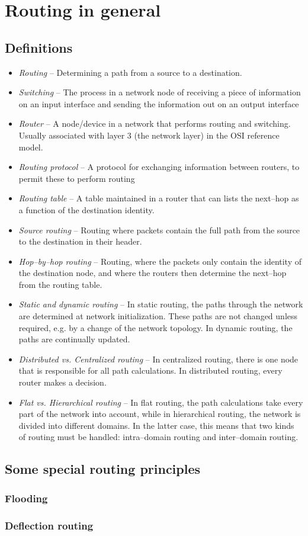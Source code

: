 \section{Routing in general}

\subsection{Definitions}
\begin{itemize}
%
\item\emph{Routing} -- Determining a path from a source to a destination.
%
\item\emph{Switching} -- The process in a network node of receiving a piece of information on an input interface and sending the information out on an output interface
%
\item\emph{Router} -- A node/device in a network that performs routing and switching. Usually associated with layer 3 (the network layer) in the OSI reference model.
%
\item\emph{Routing protocol} -- A protocol for exchanging information between routers, to permit these to perform routing
%
\item\emph{Routing table} -- A table maintained in a router that can lists the next--hop as a function of the destination identity.
%
\item\emph{Source routing} -- Routing where packets contain the full path from the source to the destination in their header.
%
\item\emph{Hop--by--hop routing} -- Routing, where the packets only contain the identity of the destination node, and where the routers then determine the next--hop from the routing table.
%
\item\emph{Static and dynamic routing} -- In static routing, the paths through the network are determined at network initialization. These paths are not changed unless required, e.g. by a change of the network topology. In dynamic routing, the paths are continually updated.
%
\item\emph{Distributed vs. Centralized routing} -- In centralized routing, there is one node that is responsible for all path calculations. In distributed routing, every router makes a decision.
%
\item\emph{Flat vs. Hierarchical routing} -- In flat routing, the path calculations take every part of the network into account, while in hierarchical routing, the network is divided into different domains. In the latter case, this means that two kinds of routing must be handled: intra--domain routing and inter--domain routing.
%
\end{itemize}

\subsection{Some special routing principles}

\subsubsection{Flooding}

\subsubsection{Deflection routing}


